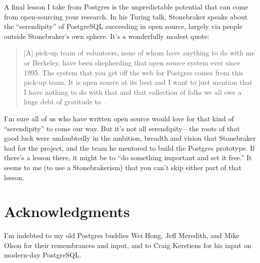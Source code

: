 \documentclass[sigconf,natbib=false]{acmart}
\begin{document}
A final lesson I take from Postgres is the unpredictable potential that can come from open-sourcing your research. In his Turing talk, Stonebraker speaks about the ``serendipity'' of PostgreSQL succeeding in open source, largely via people outside Stonebraker's own sphere. It's a wonderfully modest quote: 

\begin{quote}
[A] pick-up team of volunteers, none of whom have anything to do with me or Berkeley, have been shepherding that open source system ever since 1995. The system that you get off the web for Postgres comes from this pick-up team.  It is open source at its best and I want to just mention that I have nothing to do with that and that collection of folks we all owe a huge debt of gratitude to~\cite{stonebrakerturing}.
\end{quote}

I'm sure all of us who have written open source would love for that kind of ``serendipity'' to come our way.  But it's not all serendipity---the roots of that good luck were undoubtedly in the ambition, breadth and vision that Stonebraker had for the project, and the team he mentored to build the Postgres prototype. If there's a lesson there, it might be to ``do something important and set it free.'' It seems to me (to use a Stonebrakerism) that you can't skip either part of that lesson.

\section{Acknowledgments}

I'm indebted to my old Postgres buddies Wei Hong, Jeff Meredith, and Mike Olson for their remembrances and input, and to Craig Kerstiens for his input on modern-day PostgreSQL.


\end{document}
